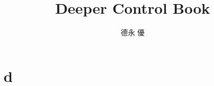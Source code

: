 \documentclass[uplatex, twocolumn, 12pt, dvipdfmx]{jsarticle}
\title{Deeper Control Book}
\author{德永 優}
\date{\rightline{\today}}
\begin{document}
\maketitle
\section{d}

\end{document}
